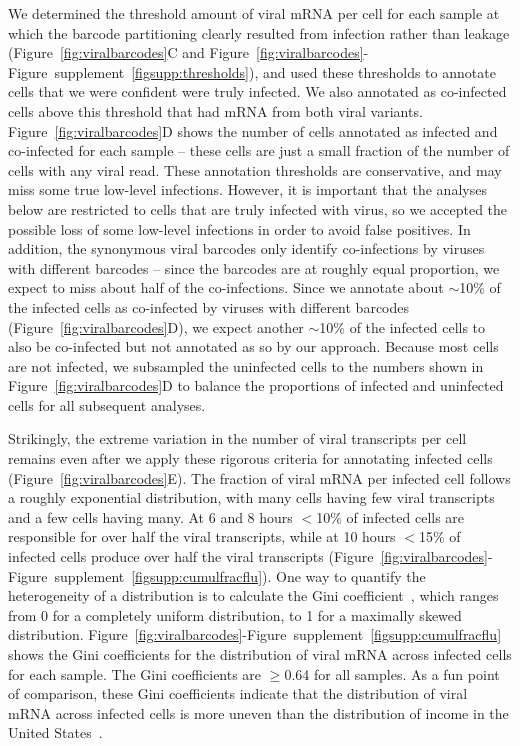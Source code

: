 \documentclass[9pt,lineno]{elife}
\begin{document}
We determined the threshold amount of viral mRNA per cell for each sample at which the barcode partitioning clearly resulted from infection rather than leakage (Figure~\ref{fig:viralbarcodes}C and Figure~\ref{fig:viralbarcodes}-Figure~supplement~\ref{figsupp:thresholds}), and used these thresholds to annotate cells that we were confident were truly infected.
We also annotated as co-infected cells above this threshold that had mRNA from both viral variants.
Figure~\ref{fig:viralbarcodes}D shows the number of cells annotated as infected and co-infected for each sample -- these cells are just a small fraction of the number of cells with any viral read.
These annotation thresholds are conservative, and may miss some true low-level infections.
However, it is important that the analyses below are restricted to cells that are truly infected with virus, so we accepted the possible loss of some low-level infections in order to avoid false positives.
In addition, the synonymous viral barcodes only identify co-infections by viruses with different barcodes -- since the barcodes are at roughly equal proportion, we expect to miss about half of the co-infections.
Since we annotate about $\sim$10\% of the infected cells as co-infected by viruses with different barcodes (Figure~\ref{fig:viralbarcodes}D), we expect another $\sim$10\% of the infected cells to also be co-infected but not annotated as so by our approach.
Because most cells are not infected, we subsampled the uninfected cells to the numbers shown in Figure~\ref{fig:viralbarcodes}D to balance the proportions of infected and uninfected cells for all subsequent analyses.

Strikingly, the extreme variation in the number of viral transcripts per cell remains even after we apply these rigorous criteria for annotating infected cells (Figure~\ref{fig:viralbarcodes}E). 
The fraction of viral mRNA per infected cell follows a roughly exponential distribution, with many cells having few viral transcripts and a few cells having many.
At 6 and 8 hours $<$10\% of infected cells are responsible for over half the viral transcripts, while at 10 hours $<$15\% of infected cells produce over half the viral transcripts (Figure~\ref{fig:viralbarcodes}-Figure~supplement~\ref{figsupp:cumulfracflu}).
One way to quantify the heterogeneity of a distribution is to calculate the Gini coefficient~\cite{gini1921measurement}, which ranges from 0 for a completely uniform distribution, to 1 for a maximally skewed distribution.
Figure~\ref{fig:viralbarcodes}-Figure~supplement~\ref{figsupp:cumulfracflu} shows the Gini coefficients for the distribution of viral mRNA across infected cells for each sample.
The Gini coefficients are $\ge$0.64 for all samples.
As a fun point of comparison, these Gini coefficients indicate that the distribution of viral mRNA across infected cells is more uneven than the distribution of income in the United States~\citep{alvaredo2011note}. 
\end{document}
